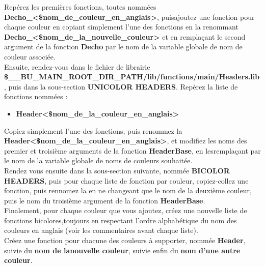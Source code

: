 \documentclass[a4paper,10pt]{article}
\begin{document}
Repérez les premières fonctions, toutes nommées \textbf{\color{mauve}Decho\_<\$nom\_de\_couleur\_en\_anglais>}, puis\linebreak ajoutez une fonction pour chaque couleur en copiant simplement l'une des fonctions en la renommant \textbf{\color{mauve}Decho\_<\$nom\_de\_la\_nouvelle\_couleur>} et en remplaçant le second argument de la fonction \textbf{\color{mauve}Decho} par le nom de la variable globale de nom de couleur associée.\\[2\baselineskip]


Ensuite, rendez-vous dans le fichier de librairie \textbf{\color{orange}\$\_\_BU\_MAIN\_ROOT\_DIR\_PATH\color{lime}/lib/functions/main/Headers.lib}, puis dans la sous-section \textbf{UNICOLOR HEADERS}. Repérez la liste de fonctions nommées :
\begin{itemize}
    \item \textbf{\color{mauve}Header<\$nom\_de\_la\_couleur\_en\_anglais>}\linebreak
\end{itemize}

Copiez simplement l'une des fonctions, puis renommez la \textbf{\color{mauve}Header<\$nom\_de\_la\_couleur\_en\_anglais>}, et modifiez les noms des premier et troisième arguments de la fonction \textbf{\color{mauve}HeaderBase}, en les\linebreak remplaçant par le nom de la variable globale de noms de couleurs souhaitée.\\[1\baselineskip]

Rendez vous ensuite dans la sous-section suivante, nommée \textbf{BICOLOR HEADERS}, puis pour chaque liste de fonction par couleur, copiez-collez une fonction, puis rennomez la en ne changeant que le nom de la deuxième couleur, puis le nom du troisième argument de la fonction \textbf{\color{mauve}HeaderBase}.\\[1\baselineskip]

Finalement, pour chaque couleur que vous ajoutez, créez une nouvelle liste de fonctions bicolores,\linebreak toujours en respectant l'ordre alphabétique du nom des couleurs en anglais (voir les commentaires avant chaque liste).\\[1\baselineskip]

Créez une fonction pour chacune des couleurs à supporter, nommée \textbf{\color{mauve}Header}, suivie du \textbf{\color{mauve}nom de la\linebreak nouvelle couleur}, suivie enfin du \textbf{\color{mauve}nom d'une autre couleur}.\\[1\baselineskip]
\end{document}
